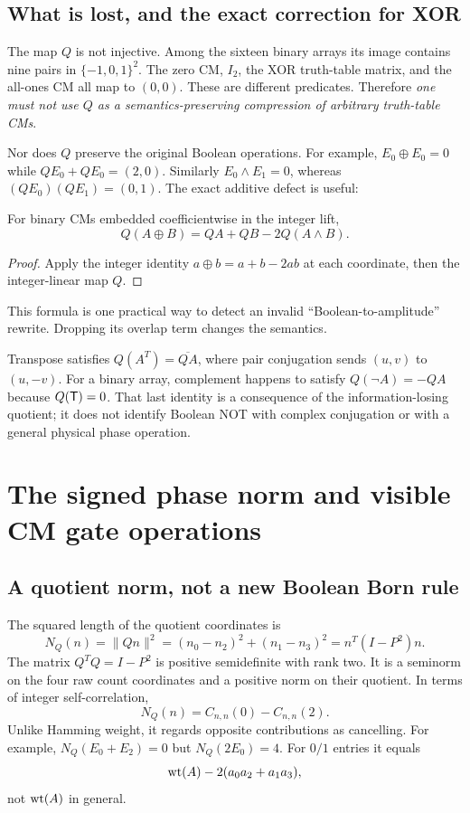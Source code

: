 \subsection{What is lost, and the exact correction for XOR}
The map $Q$ is not injective. Among the sixteen binary arrays its image contains nine pairs in $\{-1,0,1\}^2$. The zero CM, $I_2$, the XOR truth-table matrix, and the all-ones CM all map to $(0,0)$. These are different predicates. Therefore \emph{one must not use $Q$ as a semantics-preserving compression of arbitrary truth-table CMs}.

Nor does $Q$ preserve the original Boolean operations. For example, $E_0\oplus E_0=0$ while $QE_0+QE_0=(2,0)$. Similarly $E_0\land E_1=0$, whereas $(QE_0)(QE_1)=(0,1)$. The exact additive defect is useful:
\begin{proposition}\label{prop:carry}
For binary CMs embedded coefficientwise in the integer lift,
\begin{equation}\label{eq:carry}
 Q(A\oplus B)=QA+QB-2Q(A\land B).
\end{equation}
\end{proposition}
\begin{proof}
Apply the integer identity $a\oplus b=a+b-2ab$ at each coordinate, then the integer-linear map $Q$.
\end{proof}
This formula is one practical way to detect an invalid ``Boolean-to-amplitude'' rewrite. Dropping its overlap term changes the semantics.

Transpose satisfies $Q(A^T)=\overline{QA}$, where pair conjugation sends $(u,v)$ to $(u,-v)$. For a binary array, complement happens to satisfy $Q(\neg A)=-QA$ because $Q(\mathsf T)=0$. That last identity is a consequence of the information-losing quotient; it does not identify Boolean NOT with complex conjugation or with a general physical phase operation.

\section{The signed phase norm and visible CM gate operations}\label{sec:normlift}
\subsection{A quotient norm, not a new Boolean Born rule}
The squared length of the quotient coordinates is
\begin{equation}\label{eq:normQ}
 N_Q(n)=\|Qn\|^2=(n_0-n_2)^2+(n_1-n_3)^2
       =n^T(I-P^2)n.
\end{equation}
The matrix $Q^TQ=I-P^2$ is positive semidefinite with rank two. It is a seminorm on the four raw count coordinates and a positive norm on their quotient. In terms of integer self-correlation,
\begin{equation}
 N_Q(n)=C_{n,n}(0)-C_{n,n}(2).
\end{equation}
Unlike Hamming weight, it regards opposite contributions as cancelling. For example, $N_Q(E_0+E_2)=0$ but $N_Q(2E_0)=4$. For $0/1$ entries it equals
\begin{equation}
 \operatorname{wt}(A)-2(a_0a_2+a_1a_3),
\end{equation}
not $\operatorname{wt}(A)$ in general.

